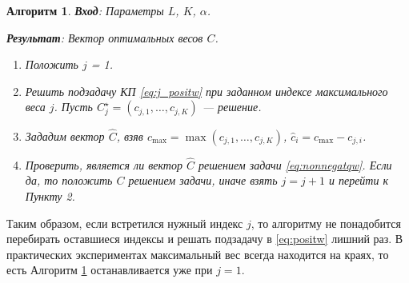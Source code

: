 \documentclass[10pt]{article}
\newtheorem{algorithm}{Алгоритм}
\begin{document}
\begin{algorithm}
	\label{alg:solveqw}
	\textbf{Вход}: Параметры $L$, $K$, $\alpha$.
	
	\textbf{Результат}:
	Вектор оптимальных весов $C$.
	
	\begin{enumerate}
		\item Положить $j$ = 1.
		\item Решить подзадачу КП \eqref{eq:j_positw} при заданном индексе максимального веса $j$. Пусть $C^\star_j = (c_{j, 1}, \ldots, c_{j, K})$ --- решение.
		\item Зададим вектор $\widehat C$, взяв $c_\text{max} = \max(c_{j, 1}, \ldots, c_{j, K})$, $\hat c_i = c_\text{max} - c_{j, i}$.
		\item Проверить, является ли вектор $\widehat C$ решением задачи \eqref{eq:nonnegatqw}. Если да, то положить $C$ решением задачи, иначе взять $j = j + 1$ и перейти к Пункту 2.
	\end{enumerate}
\end{algorithm}

Таким образом, если встретился нужный индекс $j$, то алгоритму не понадобится перебирать оставшиеся индексы и решать подзадачу в \ref{eq:positw} лишний раз. В практических экспериментах максимальный вес всегда находится на краях, то есть Алгоритм \ref{alg:solveqw} останавливается уже при $j = 1$.
\end{document}
